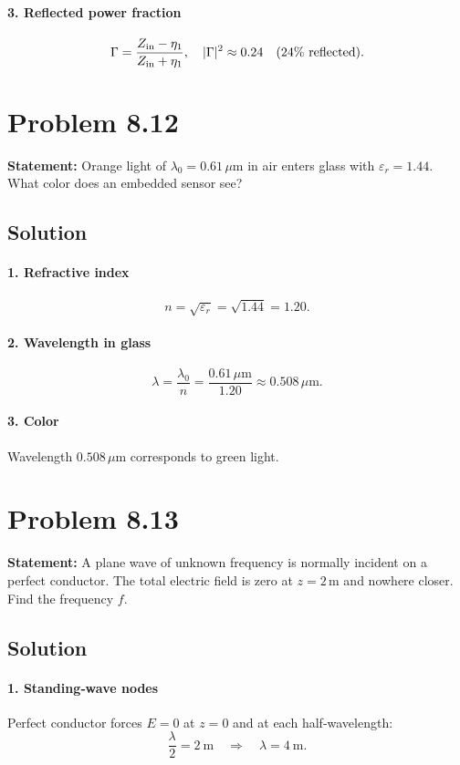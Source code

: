 \paragraph{3. Reflected power fraction}
\[
\Gamma = \frac{Z_{\rm in} - \eta_1}{Z_{\rm in} + \eta_1}, 
\quad
|\Gamma|^2 \approx 0.24\quad(24\%\text{ reflected}).
\]

\section*{Problem 8.12}
\textbf{Statement:} Orange light of $\lambda_0=0.61\,\mu$m in air enters glass with $\varepsilon_r=1.44$. What color does an embedded sensor see?

\subsection*{Solution}
\paragraph{1. Refractive index}
\[
n = \sqrt{\varepsilon_r} = \sqrt{1.44} = 1.20.
\]
\paragraph{2. Wavelength in glass}
\[
\lambda = \frac{\lambda_0}{n} = \frac{0.61\,\mu\mathrm m}{1.20} \approx 0.508\,\mu\mathrm m.
\]
\paragraph{3. Color}
Wavelength $0.508\,\mu$m corresponds to green light.

\section*{Problem 8.13}
\textbf{Statement:} A plane wave of unknown frequency is normally incident on a perfect conductor. The total electric field is zero at $z=2\,$m and nowhere closer. Find the frequency $f$.

\subsection*{Solution}
\paragraph{1. Standing‐wave nodes}
Perfect conductor forces $E=0$ at $z=0$ and at each half‐wavelength:
\[
\frac{\lambda}{2} = 2\ \mathrm m
\quad\Longrightarrow\quad
\lambda = 4\ \mathrm m.
\]
